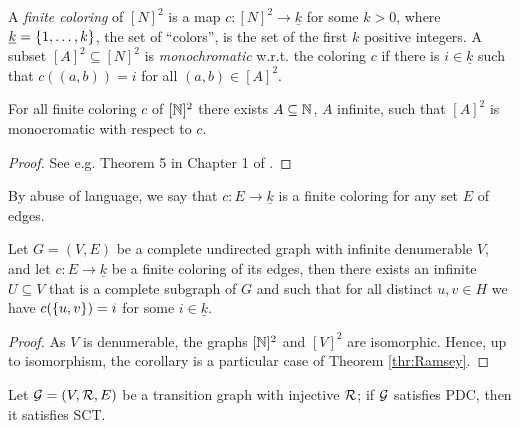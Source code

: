 A {\em finite coloring} of $[N]^2$ is a map  
$c:[N]^2 \to \underline{k}$ for some $k > 0$, where $\underline{k} = \{ 1, \ldots , k \}$, the set of ``colors'', is the set of the first $k$ positive integers.
A subset $[A]^2 \subseteq [N]^2$ is {\em monochromatic} w.r.t. the coloring $c$ if there is $i \in \underline{k}$ such that  $c((a,b)) = i$ for all
$(a,b) \in [A]^2$.

\begin{theorem}\label{thr:Ramsey}
For all finite coloring $c$ of $[\mathbb{N}]^2$ there exists $A \subseteq \mathbb{N}$, $A$ infinite, such that $[A]^2$ is monocromatic with respect to $c$.
\end{theorem}

\begin{proof} See e.g. Theorem 5 in Chapter 1 of \cite{Graham1980}.
\end{proof}

By abuse of language, we say that $c:E \to \underline{k}$ is a finite coloring for any set $E$ of edges.

\begin{corollary}\label{cor:Ramsey}
Let $G = (V, E)$ be a complete undirected graph with infinite denumerable $V$, and let $c: E \to \underline{k}$ be a finite coloring of its edges,
then there exists an infinite $U \subseteq V$ that is a complete subgraph of $G$ and such that for all distinct $u, v \in H$ we have $c(\{ u,v \}) = i$ for some $i \in \underline{k}$.
\end{corollary}

\begin{proof}
As $V$ is denumerable, the graphs $[\mathbb{N}]^2$ and $[V]^2$ are isomorphic.
Hence,  up to isomorphism, the corollary is a particular case of Theorem \ref{thr:Ramsey}.
\end{proof}


\begin{theorem}\label{thr:PDC+injImpliesGTC}
Let $\mathcal{G} = (V, \mathcal{R}, E)$ be a transition graph with injective $\mathcal{R}$; if $\mathcal{G}$ satisfies PDC, then it satisfies SCT.
\end{theorem}

